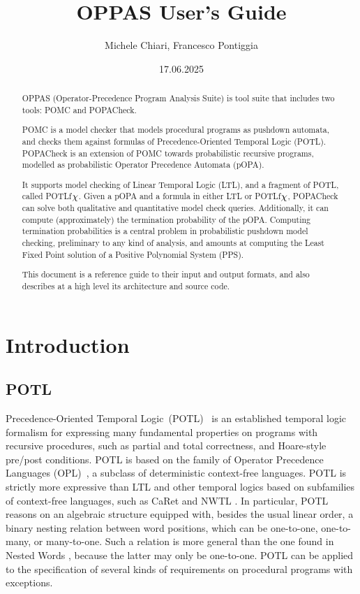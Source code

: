 \documentclass[9pt,a4paper]{article}
\title{OPPAS User's Guide}
\author{Michele Chiari, Francesco Pontiggia}
\date{17.06.2025}
\begin{document}
\maketitle


\begin{abstract}
OPPAS (Operator-Precedence Program Analysis Suite) is tool suite that includes two tools: POMC and POPACheck.

POMC is a model checker that models procedural programs as pushdown automata,
and checks them against formulas of Precedence-Oriented Temporal Logic (POTL).
POPACheck is an extension of POMC towards probabilistic recursive programs, modelled as probabilistic Operator Precedence Automata (pOPA).

It supports model checking of Linear Temporal Logic (LTL), and a fragment of POTL, called POTLf$\chi$.
Given a pOPA and a formula in either LTL or POTLf$\chi$, POPACheck can solve both qualitative and quantitative model check queries.
Additionally, it can compute (approximately) the termination probability of the pOPA.
Computing termination probabilities is a central problem in probabilistic pushdown model checking,
 preliminary to any kind of analysis, and amounts at computing the Least Fixed Point solution of a Positive Polynomial System (PPS).

This document is a reference guide to their input and output formats,
and also describes at a high level its architecture and source code.
\end{abstract}

\section{Introduction}

\subsection{POTL}

Precedence-Oriented Temporal Logic~(POTL)~\cite{ChiariMP21,ChiariMP21b} is an established temporal
logic formalism for expressing many fundamental properties on programs with recursive procedures,
such as partial and total correctness, and Hoare-style pre/post conditions.
POTL is based on the family of Operator Precedence Languages (OPL)~\cite{MP18},
a subclass of deterministic context-free languages.
POTL is strictly more expressive than LTL and other temporal logics based
on subfamilies of context-free languages, such as CaRet \cite{AlurEM04}
and NWTL \cite{lmcs/AlurABEIL08}.
In particular, POTL reasons on an algebraic structure equipped with,
besides the usual linear order, a binary nesting relation between word positions,
which can be one-to-one, one-to-many, or many-to-one.
Such a relation is more general than the one found in Nested Words \cite{jacm/AlurM09},
because the latter may only be one-to-one.
POTL can be applied to the specification of several kinds of requirements
on procedural programs with exceptions.
\end{document}
